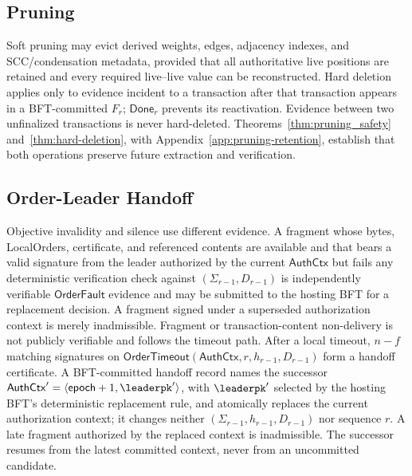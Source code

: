 \subsection{Pruning}
\label{sec:protocol-pruning}

Soft pruning may evict derived weights, edges, adjacency indexes, and
SCC/condensation metadata, provided that all authoritative live positions are
retained and every required live--live value can be reconstructed.  Hard
deletion applies only to evidence incident to a transaction after that
transaction appears in a BFT-committed $F_r$; $\mathsf{Done}_r$ prevents its
reactivation.  Evidence between two unfinalized transactions is never
hard-deleted.  Theorems~\ref{thm:pruning_safety} and~\ref{thm:hard-deletion},
with Appendix~\ref{app:pruning-retention}, establish that both operations
preserve future extraction and verification.

\subsection{Order-Leader Handoff}
\label{sec:order-leader-handoff}

Objective invalidity and silence use different evidence.  A fragment whose
bytes, LocalOrders, certificate, and referenced contents are available and that
bears a valid signature from the leader authorized by the current
$\mathsf{AuthCtx}$ but fails any deterministic verification check against
$(\Sigma_{r-1},D_{r-1})$ is independently verifiable $\mathsf{OrderFault}$
evidence and may be submitted to the hosting BFT for a replacement decision.
A fragment signed under a superseded authorization context is merely
inadmissible.  Fragment or transaction-content non-delivery is not publicly
verifiable and follows the timeout path.  After a
local timeout, $n-f$ matching signatures on
$\mathsf{OrderTimeout}(\mathsf{AuthCtx},r,h_{r-1},D_{r-1})$ form a handoff
certificate.  A BFT-committed handoff record names the successor
$\mathsf{AuthCtx}'=\langle\mathsf{epoch}+1,\leaderpk'\rangle$, with
$\leaderpk'$ selected by the hosting BFT's deterministic replacement rule, and atomically
replaces the current authorization context;
it changes neither $(\Sigma_{r-1},h_{r-1},D_{r-1})$ nor sequence $r$.  A late
fragment authorized by the replaced context is inadmissible.  The successor
resumes from the latest committed context, never from an uncommitted candidate.

